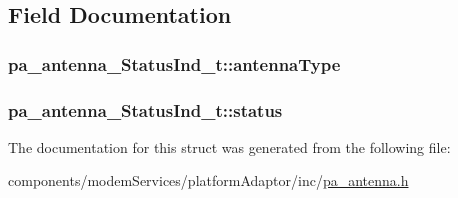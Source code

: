 \subsection{Field Documentation}
\subsubsection[{\texorpdfstring{antenna\+Type}{antennaType}}]{ pa\+\_\+antenna\+\_\+\+Status\+Ind\+\_\+t\+::antenna\+Type}\hypertarget{structpa__antenna___status_ind__t_added82300912752c6c4ae49c25b655e2}{}\label{structpa__antenna___status_ind__t_added82300912752c6c4ae49c25b655e2}
\subsubsection[{\texorpdfstring{status}{status}}]{ pa\+\_\+antenna\+\_\+\+Status\+Ind\+\_\+t\+::status}\hypertarget{structpa__antenna___status_ind__t_a27036cb48db59c18aaf6d920632ce169}{}\label{structpa__antenna___status_ind__t_a27036cb48db59c18aaf6d920632ce169}


The documentation for this struct was generated from the following file\+:\begin{DoxyCompactItemize}
\item 
components/modem\+Services/platform\+Adaptor/inc/\hyperlink{pa__antenna_8h}{pa\+\_\+antenna.\+h}\end{DoxyCompactItemize}
